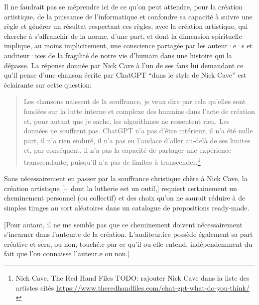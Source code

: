 Il ne faudrait pas se méprendre ici de ce qu'on peut attendre, pour la création artistique, de la puissance de l'informatique et confondre sa capacité à suivre une règle et générer un résultat respectant ces règles, avec la création artistique, qui cherche à s'affranchir de la norme, d'une part, et dont la dimension spirituelle implique, au moins implicitement, une conscience partagée par les auteur·e·s et auditeur·ices de la fragilité de notre vie d'humain dans une histoire qui la dépasse. La réponse donnée par Nick Cave à l'un de ses fans lui demandant ce qu'il pense d'une chanson écrite par ChatGPT ``dans le style de Nick Cave'' est éclairante sur cette question:

\begin{quotation}
Les chansons naissent de la souffrance, je veux dire par cela qu'elles sont fondées sur la lutte interne et complexe des humains dans l'acte de création et, pour autant que je sache, les algorithmes ne ressentent rien. Les données ne souffrent pas. ChatGPT n'a pas d'être intérieur, il n'a été nulle part, il n'a rien enduré, il n'a pas eu l'audace d'aller au-delà de ses limites et, par conséquent, il n'a pas la capacité de partager une expérience transcendante, puisqu'il n'a pas de limites à transcender.\footnote{Nick Cave, The Red Hand Files TODO: rajouter Nick Cave dans la liste des artistes cités \url{https://www.theredhandfiles.com/chat-gpt-what-do-you-think/}}
\end{quotation}

Sans nécessairement en passer par la souffrance christique chère à Nick Cave, la création artistique [--~dont la lutherie est un outil,] requiert certainement un cheminement personnel (ou collectif) et des choix qu'on ne saurait réduire à de simples tirages au sort aléatoires dans un catalogue de propositions ready-made.

[Pour autant, il ne me semble pas que ce cheminement doivent nécessairement s'incarner dans l'auteur.e de la création. L'auditeur.ice possède également sa part créative et sera, ou non, touché.e par ce qu'il ou elle entend, indépendemment du fait que l'on connaisse l'auteur.e ou non.]




